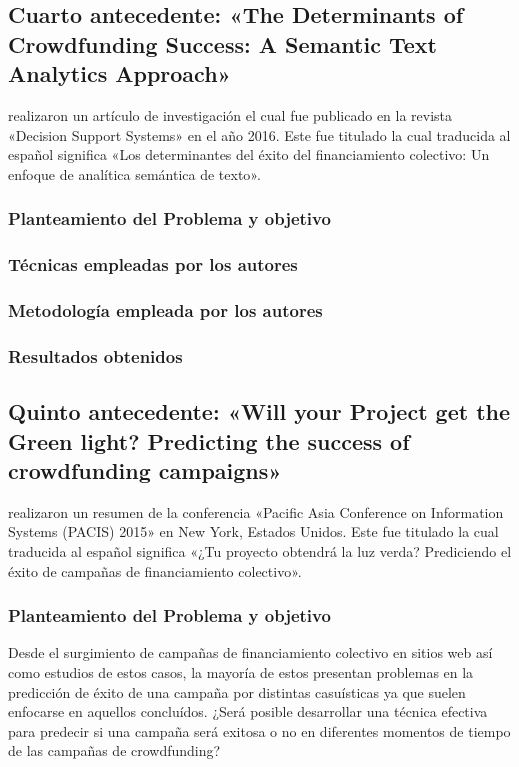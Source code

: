 \subsection{Cuarto antecedente: «The Determinants of Crowdfunding Success: A Semantic Text Analytics Approach» \citep*{pr_yuan2016textanalytics}}
\citeauthor{pr_yuan2016textanalytics} realizaron un artículo de investigación el cual fue publicado en la revista «Decision Support Systems» en el año 2016. Este fue titulado  la cual traducida al español significa «Los determinantes del éxito del financiamiento colectivo: Un enfoque de analítica semántica de texto».

\subsubsection{Planteamiento del Problema y objetivo}


\subsubsection{Técnicas empleadas por los autores}


\subsubsection{Metodología empleada por los autores}


\subsubsection{Resultados obtenidos}



\subsection{Quinto antecedente: «Will your Project get the Green light? Predicting the success of crowdfunding campaigns» \citep*{pr_chen2015predcrowd}}
\citeauthor{pr_chen2015predcrowd} realizaron un resumen de la conferencia «Pacific Asia Conference on Information Systems (PACIS) 2015» en New York, Estados Unidos. Este fue titulado  la cual traducida al español significa «¿Tu proyecto obtendrá la luz verda? Prediciendo el éxito de campañas de financiamiento colectivo».

\subsubsection{Planteamiento del Problema y objetivo}
Desde el surgimiento de campañas de financiamiento colectivo en sitios web así como estudios de estos casos, la mayoría de estos presentan problemas en la predicción de éxito de una campaña por distintas casuísticas ya que suelen enfocarse en aquellos concluídos. ¿Será posible desarrollar una técnica efectiva para predecir si una campaña será exitosa o no en diferentes momentos de tiempo de las campañas de crowdfunding?

